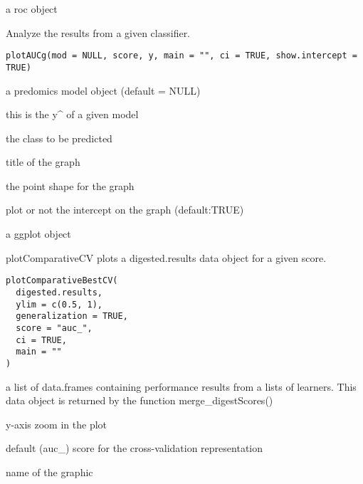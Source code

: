\documentclass[a4paper]{book}
\begin{document}
%
\begin{Value}
a roc object
\end{Value}
%
\begin{Description}
Analyze the results from a given classifier.
\end{Description}
%
\begin{Usage}
\begin{verbatim}
plotAUCg(mod = NULL, score, y, main = "", ci = TRUE, show.intercept = TRUE)
\end{verbatim}
\end{Usage}
%
\begin{Arguments}
\begin{ldescription}
\item[\code{mod:}] a predomics model object (default = NULL)

\item[\code{score:}] this is the y\textasciicircum{} of a given model

\item[\code{y:}] the class to be predicted

\item[\code{main:}] title of the graph

\item[\code{ci:}] the point shape for the graph

\item[\code{show.intercept:}] plot or not the intercept on the graph (default:TRUE)
\end{ldescription}
\end{Arguments}
%
\begin{Value}
a ggplot object
\end{Value}
%
\begin{Description}
plotComparativeCV plots a digested.results data object for a given score.
\end{Description}
%
\begin{Usage}
\begin{verbatim}
plotComparativeBestCV(
  digested.results,
  ylim = c(0.5, 1),
  generalization = TRUE,
  score = "auc_",
  ci = TRUE,
  main = ""
)
\end{verbatim}
\end{Usage}
%
\begin{Arguments}
\begin{ldescription}
\item[\code{digested.results:}] a list of data.frames containing performance results from a lists of learners. This data object is returned by the function merge\_digestScores()

\item[\code{ylim:}] y-axis zoom in the plot

\item[\code{score:}] default (auc\_) score for the cross-validation representation

\item[\code{main:}] name of the graphic
\end{ldescription}
\end{Arguments}
\end{document}
